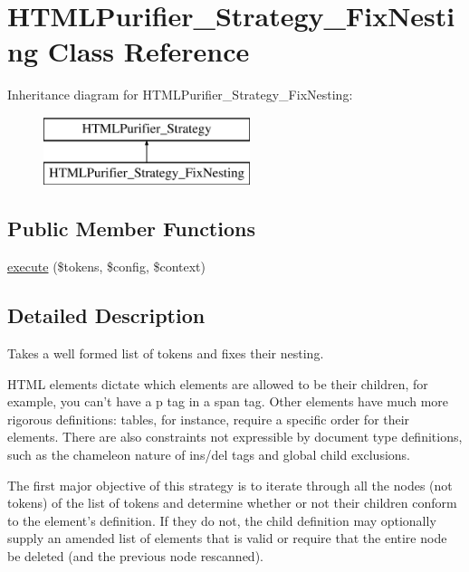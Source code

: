 \hypertarget{classHTMLPurifier__Strategy__FixNesting}{\section{H\+T\+M\+L\+Purifier\+\_\+\+Strategy\+\_\+\+Fix\+Nesting Class Reference}
\label{classHTMLPurifier__Strategy__FixNesting}
}
Inheritance diagram for H\+T\+M\+L\+Purifier\+\_\+\+Strategy\+\_\+\+Fix\+Nesting\+:\begin{figure}[H]
\begin{center}
\leavevmode
\includegraphics[height=2.000000cm]{classHTMLPurifier__Strategy__FixNesting}
\end{center}
\end{figure}
\subsection*{Public Member Functions}
\begin{DoxyCompactItemize}
\item 
\hyperlink{classHTMLPurifier__Strategy__FixNesting_acaf931b0a5e7d2af678f986b60e29373}{execute} (\$tokens, \$config, \$context)
\end{DoxyCompactItemize}


\subsection{Detailed Description}
Takes a well formed list of tokens and fixes their nesting.

H\+T\+M\+L elements dictate which elements are allowed to be their children, for example, you can't have a p tag in a span tag. Other elements have much more rigorous definitions\+: tables, for instance, require a specific order for their elements. There are also constraints not expressible by document type definitions, such as the chameleon nature of ins/del tags and global child exclusions.

The first major objective of this strategy is to iterate through all the nodes (not tokens) of the list of tokens and determine whether or not their children conform to the element's definition. If they do not, the child definition may optionally supply an amended list of elements that is valid or require that the entire node be deleted (and the previous node rescanned).

